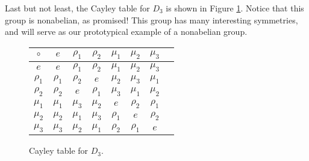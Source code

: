 Last but not least, the Cayley table for $D_3$ is shown in Figure \ref{cayleyD3}. Notice that this group is nonabelian, as promised! This group has many interesting symmetries, and will serve as our prototypical example of a nonabelian group.

\begin{figure}[h]
\centering
\begin{tabular}{c | c c c c c c c}
    $\circ$  & $e$      & $\rho_1$ & $\rho_2$ & $\mu_1$  & $\mu_2$  & $\mu_3$ \\
    \hline
    $e$      & $e$      & $\rho_1$ & $\rho_2$ & $\mu_1$  & $\mu_2$  & $\mu_3$ \\
    $\rho_1$ & $\rho_1$ & $\rho_2$ & $e$      & $\mu_2$  & $\mu_3$  & $\mu_1$ \\
    $\rho_2$ & $\rho_2$ & $e$      & $\rho_1$ & $\mu_3$  & $\mu_1$  & $\mu_2$ \\
    $\mu_1$  & $\mu_1$  & $\mu_3$  & $\mu_2$  & $e$      & $\rho_2$ & $\rho_1$\\
    $\mu_2$  & $\mu_2$  & $\mu_1$  & $\mu_3$  & $\rho_1$ & $e$      & $\rho_2$\\
    $\mu_3$  & $\mu_3$  & $\mu_2$  & $\mu_1$  & $\rho_2$ & $\rho_1$ & $e$     \\
\end{tabular}
\caption{Cayley table for $D_3$.}
\label{cayleyD3}
\end{figure}
